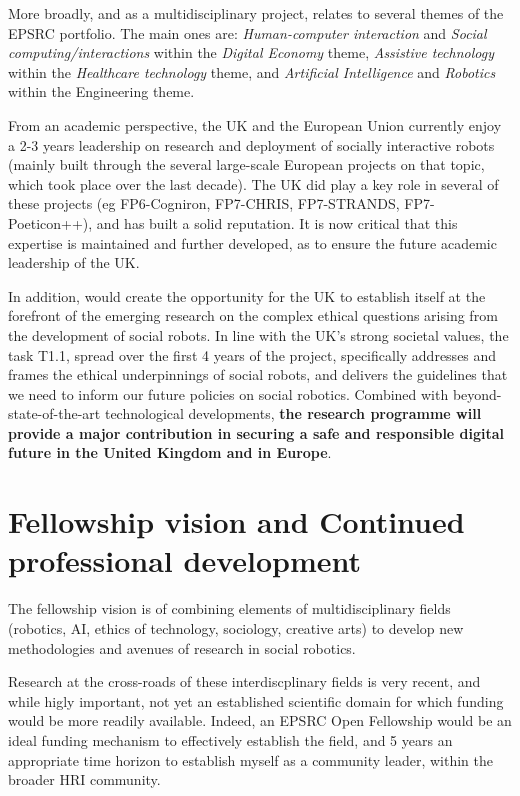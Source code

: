 More broadly, and as a multidisciplinary project, \project relates to several
themes of the EPSRC portfolio. The main ones are: \emph{Human-computer
interaction} and \emph{Social computing/interactions} within the \emph{Digital
Economy} theme, \emph{Assistive technology} within the \emph{Healthcare
technology} theme, and \emph{Artificial Intelligence} and \emph{Robotics} within
the Engineering theme.


From an academic perspective, the UK and the European Union currently enjoy a
2-3 years leadership on research and deployment of socially interactive robots
(mainly built through the several large-scale European projects on that topic,
which took place over the last decade). The UK did play a key role in several of
these projects (eg FP6-Cogniron, FP7-CHRIS, FP7-STRANDS, FP7-Poeticon++), and
has built a solid reputation. It is now critical that this expertise is
maintained and further developed, as to ensure the future academic leadership of
the UK.

In addition, \project would create the opportunity for the UK to establish
itself at the forefront of the emerging research on the complex ethical
questions arising from the development of social robots. In line with the UK's
strong societal values, the task T1.1, spread over the first 4 years of the
project, specifically addresses and frames the ethical underpinnings of social
robots, and delivers the guidelines that we need to inform our future policies
on social robotics. Combined with beyond-state-of-the-art technological
developments, \textbf{the \project research programme will provide a major
contribution in securing a safe and responsible digital future in the United
Kingdom and in Europe}. 



\section{Fellowship vision and Continued professional development}

The fellowship vision is of combining elements of multidisciplinary fields
(robotics, AI, ethics of technology, sociology, creative arts) to
develop new methodologies and avenues of research in social robotics.

Research at the cross-roads of these interdiscplinary fields is very recent, and
while higly important, not yet an established scientific domain for which
funding would be more readily available. Indeed, an EPSRC Open Fellowship would
be an ideal funding mechanism to effectively establish the field, and 5 years an
appropriate time horizon to establish myself as a community leader, within the
broader HRI community.

